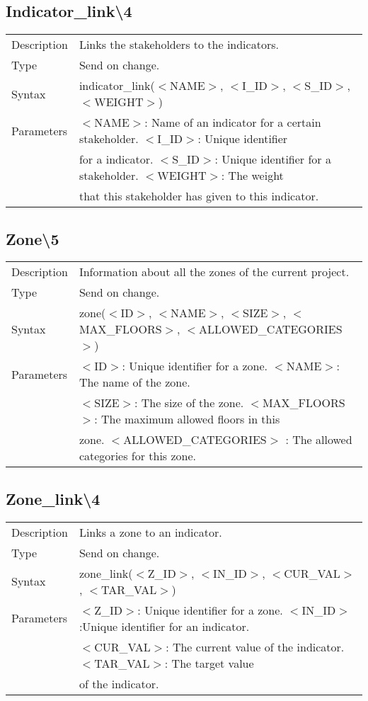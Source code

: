 \documentclass{article}
\begin{document}
\subsection*{Indicator\_link\textbackslash4}

\begin{tabular}{ l l }
  Description & Links the stakeholders to the indicators.  \\
  Type & Send on change. \\
  Syntax & indicator\_link($<$NAME$>$, $<$I\_ID$>$, $<$S\_ID$>$, $<$WEIGHT$>$) \\
  Parameters &  $<$NAME$>$: Name of an indicator for a certain stakeholder. $<$I\_ID$>$: Unique identifier \\
    & for a indicator. $<$S\_ID$>$:  Unique identifier for a stakeholder. $<$WEIGHT$>$: The weight \\
    & that this stakeholder has given to this indicator.
\end{tabular}

\subsection*{Zone\textbackslash5}

\begin{tabular}{ l l }
  Description & Information about all the zones of the current project. \\
  Type & Send on change. \\
  Syntax & zone($<$ID$>$, $<$NAME$>$, $<$SIZE$>$, $<$MAX\_FLOORS$>$, $<$ALLOWED\_CATEGORIES$>$) \\
  Parameters &  $<$ID$>$: Unique identifier for a zone. $<$NAME$>$: The name of the zone. \\
    & $<$SIZE$>$: The size of the zone. $<$MAX\_FLOORS$>$: The maximum allowed floors in this \\
    & zone. $<$ALLOWED\_CATEGORIES$>$ : The allowed categories for this zone.
\end{tabular}

\subsection*{Zone\_link\textbackslash4}

\begin{tabular}{ l l }
  Description & Links a zone to an indicator.  \\
  Type & Send on change. \\
  Syntax & zone\_link($<$Z\_ID$>$, $<$IN\_ID$>$, $<$CUR\_VAL$>$, $<$TAR\_VAL$>$) \\
  Parameters &  $<$Z\_ID$>$: Unique identifier for a zone. $<$IN\_ID$>$:Unique identifier for an indicator. \\
    & $<$CUR\_VAL$>$: The current value of the indicator. $<$TAR\_VAL$>$:  The target value \\
    & of the indicator.
\end{tabular}
\end{document}
